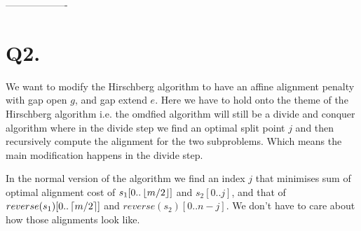 \documentclass[a4paper,11pt]{article}
\begin{document}
% 
\begin{center}
 -------------------
\end{center}

\section*{Q2.}
We want to modify the Hirschberg algorithm to have an affine alignment
penalty with gap open $g$, and gap extend $e$. Here we have to hold onto the theme of the Hirschberg algorithm i.e. the omdfied algorithm will still be a divide and conquer algorithm where in the divide step we find an optimal split point $j$ and then recursively compute the alignment for the two subproblems. Which means the main modification happens in the divide step.

In the normal version of the algorithm we find an index $j$  that minimises sum of  optimal alignment cost of $s_1[0..\left\lfloor m/2 \right\rfloor]$ and $ s_2[0..j]$, and that of $reverse(s_1)[0..\left\lceil m/2 \right\rceil]$ and $ reverse(s_2)[0..n-j]$. We don't have to care about how those alignments look like.
\end{document}
